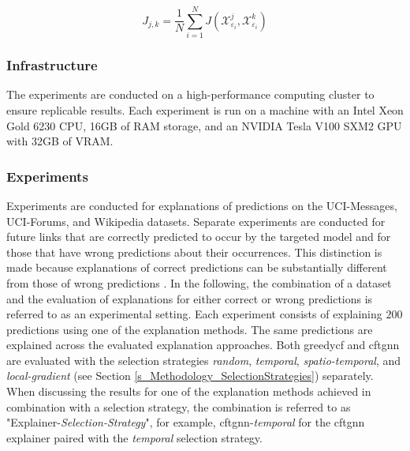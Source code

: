 \begin{equation}
    J_{j,k} = \frac{1}{N} \sum_{i = 1}^N J(\mathcal{X}_{\varepsilon_i}^j, \mathcal{X}_{\varepsilon_i}^k)
\end{equation}




% 

\subsubsection{Infrastructure}
\label{s_Evaluation_Setup_Infrastructure}
The experiments are conducted on a high-performance computing cluster to ensure replicable results. Each experiment is run on a machine with an Intel Xeon Gold 6230 CPU, 16GB of RAM storage, and an NVIDIA Tesla V100 SXM2 GPU with 32GB of VRAM.


\subsubsection{Experiments}
\label{s_Evaluation_Setup_Experiments}

Experiments are conducted for explanations of predictions on the UCI-Messages, UCI-Forums, and Wikipedia datasets. Separate experiments are conducted for future links that are correctly predicted to occur by the targeted model and for those that have wrong predictions about their occurrences. This distinction is made because explanations of correct predictions can be substantially different from those of wrong predictions \cite{amara_graphframex_2022}. In the following, the combination of a dataset and the evaluation of explanations for either correct or wrong predictions is referred to as an experimental setting. Each experiment consists of explaining $200$ predictions using one of the explanation methods. The same predictions are explained across the evaluated explanation approaches. Both \gls{greedycf} and \gls{cftgnn} are evaluated with the selection strategies \textit{random}, \textit{temporal}, \textit{spatio-temporal}, and \textit{local-gradient} (see Section \ref{s_Methodology_SelectionStrategies}) separately. When discussing the results for one of the explanation methods achieved in combination with a selection strategy, the combination is referred to as "Explainer-\textit{Selection-Strategy}", for example, \gls{cftgnn}-\textit{temporal} for the \gls{cftgnn} explainer paired with the \textit{temporal} selection strategy.

